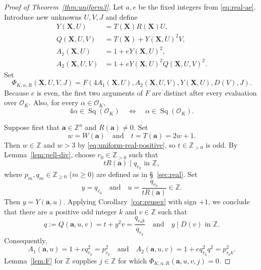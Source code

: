 \documentclass[12pt]{amsart}
\numberwithin{equation}{section}
\theoremstyle{remark}
\theoremstyle{plain}
\newcommand{\Z}{\mathbb{Z}}
\newcommand{\sO}{\mathcal{O}}
\newcommand{\bX}{\mathbf{X}}
\newcommand{\ba}{\mathbf{a}}
\newcommand{\Sq}[1]{\operatorname{Sq}(#1)}
\begin{document}
\begin{proof}[Proof of Theorem~\ref{thm:uniform3}]
Let $a,e$ be the fixed integers from \eqref{eq:real-ae}. Introduce new
unknowns $U,V,J$ and define
\begin{align*}
Y(\bX,U)&=T(\bX)R(\bX)U,\\
Q(\bX,U,V)&=T(\bX)+Y(\bX,U)^2V,\\
A_1(\bX,U)&=1+eY(\bX,U)^2,\\
A_2(\bX,U,V)&=1+eY(\bX,U)^2Q(\bX,U,V)^2.
\end{align*}
Set
\[
\Phi_{K,n,R}(\bX,U,V,J)=F\left(4A_1(\bX,U),A_2(\bX,U,V),Y(\bX,U),D(V),J\right).
\]
Because $e$ is even, the first two arguments of $F$ are distinct after every
evaluation over $\sO_K$. Also, for every $\alpha\in\sO_K$,
\begin{equation}\label{eq:uniform4square}
4\alpha\in\Sq{\sO_K}\quad\Longleftrightarrow\quad\alpha\in\Sq{\sO_K}.
\end{equation}

Suppose first that $\ba\in\Z^n$ and $R(\ba)\neq0$. Set
\[
w=W(\ba)\quad\text{and}\quad t=T(\ba)=2w+1.
\]
Then $w\in\Z$ and $w>3$ by \eqref{eq:uniform-real-positive}, so $t\in\Z_{>0}$ is odd. By Lemma~\ref{lem:pell-div}, choose $r_0\in\Z_{>0}$ such that
\[
tR(\ba)\mid q_{r_0}\text{ in }\Z,
\]
where $p_{m},q_{m}\in\Z_{\geq0}$ ($m\geq0$) are defined as in \S~\ref{sec:real}. Set
\[
y=q_{r_0}\quad\text{and}\quad u=\frac{q_{r_0}}{tR(\ba)}\in\Z.
\]
Then $y=Y(\ba,u)$. Applying Corollary~\ref{cor:reusex} with sign $+1$, we conclude that there are a positive odd integer $k$ and $v\in\Z$ such that
\[
q:=Q(\ba,u,v)=t+y^2v=\frac{q_{r_0k}}{q_{r_0}}\quad\text{and}\quad y\mid D(v)\text{ in }\Z.
\]
Consequently,
\[
A_1(\ba,u)=1+eq_{r_0}^2=p_{r_0}^2\quad\text{and}\quad A_2(\ba,u,v)=1+eq_{r_0}^2q^2=p_{r_0k}^2.
\]
Lemma~\ref{lem:F} for $\Z$ supplies $j\in\Z$ for which
$\Phi_{K,n,R}(\ba,u,v,j)=0$.


\end{proof}
\end{document}

